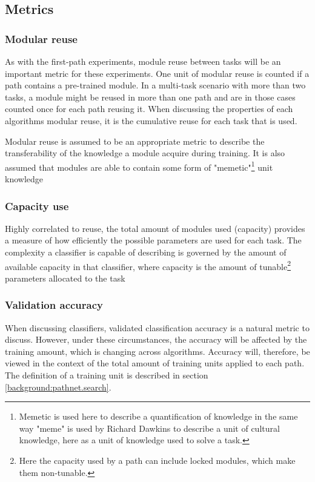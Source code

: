 \subsection{Metrics}
\label{exp2:metrics}

\subsubsection{Modular reuse}
As with the first-path experiments, module reuse between tasks will be an important metric for these experiments. One unit of modular reuse is counted if a path contains a pre-trained module. In a multi-task scenario with more than two tasks, a module might be reused in more than one path and are in those cases counted once for each path reusing it. When discussing the properties of each algorithms modular reuse, it is the cumulative reuse for each task that is used.

Modular reuse is assumed to be an appropriate metric to describe the transferability of the knowledge a module acquire during training. It is also assumed that modules are able to contain some form of "memetic"\footnote{Memetic is used here to describe a quantification of knowledge in the same way "meme" is used by Richard Dawkins\cite{selfishGene} to describe a unit of cultural knowledge, here as a unit of knowledge used to solve a task.} unit knowledge

\subsubsection{Capacity use}
Highly correlated to reuse, the total amount of modules used (capacity) provides a measure of how efficiently the possible parameters are used for each task. The complexity a classifier is capable of describing is governed by the amount of available capacity in that classifier, where capacity is the amount of tunable\footnote{Here the capacity used by a path can include locked modules, which make them non-tunable.} parameters allocated to the task

\subsubsection{Validation accuracy}
When discussing classifiers, validated classification accuracy is a natural metric to discuss. However, under these circumstances, the accuracy will be affected by the training amount, which is changing across algorithms. Accuracy will, therefore, be viewed in the context of the total amount of training units applied to each path. The definition of a training unit is described in section \ref{background:pathnet.search}.

